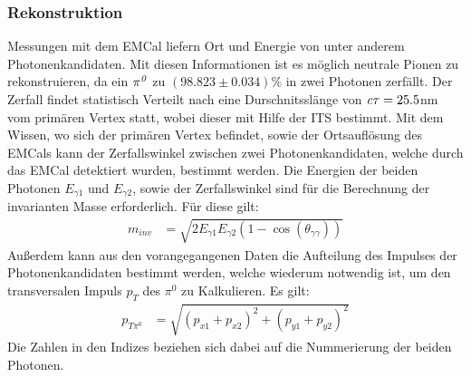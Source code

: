 \documentclass[]{article}
\begin{document}
	\subsubsection{Rekonstruktion}
	Messungen mit dem EMCal liefern Ort und Energie von unter anderem Photonenkandidaten. Mit diesen Informationen ist es m{\"o}glich neutrale Pionen zu rekonstruieren, da ein ${\it \pi^{0}}$ zu $\left( 98.823\pm0.034\right)\%$ in zwei Photonen zerf{\"a}llt. Der Zerfall findet statistisch Verteilt nach eine Durschnitssl{\"a}nge von ${\it c\tau} = 25.5$nm vom prim{\"a}ren Vertex statt, wobei dieser mit Hilfe der ITS bestimmt.
	Mit dem Wissen, wo sich der prim{\"a}ren Vertex befindet, sowie der Ortsaufl{\"o}sung des EMCals kann der Zerfallswinkel zwischen zwei Photonenkandidaten, welche durch das EMCal detektiert wurden, bestimmt werden.
	Die Energien der beiden Photonen $E_{\gamma1}$ und $E_{\gamma2}$, sowie der Zerfallswinkel sind f{\"u}r die Berechnung der invarianten Masse erforderlich. F{\"u}r diese gilt:
	\begin{align}
	\label{eq_invmass}
	m_{inv} &= \sqrt{2E_{\gamma1}E_{\gamma2}(1-\cos\left( \theta_{\gamma\gamma}\right) )} 
	\end{align}
	Au{\ss}erdem kann aus den vorangegangenen Daten die Aufteilung des Impulses der Photonenkandidaten bestimmt werden, welche wiederum notwendig ist, um den transversalen Impuls $p_{T}$ des $\pi^{0}$ zu Kalkulieren.
	Es gilt:
	\begin{align}
	\label{eq_pt}
	p_{T\pi^{0}} &= \sqrt{\left(p_{x1}+p_{x2}\right)^{2} +\left(p_{y1}+p_{y2}\right)^{2}} 
	\end{align}
	Die Zahlen in den Indizes beziehen sich dabei auf die Nummerierung der beiden Photonen.
\end{document}
